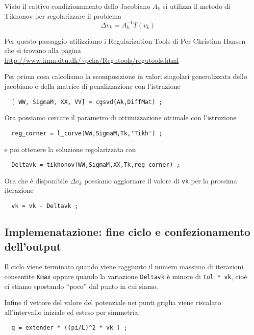 \documentclass[a4paper,10pt]{article}
\theoremstyle{plain}
\theoremstyle{definition}
\theoremstyle{remark}
\begin{document}
Visto il cattivo condizionamento dello Jacobiano $A_k$ si utilizza il
metodo di Tikhonov per regolarizzare il problema 
\begin{equation*}
  \Delta v _k = A_k ^{-1} T(v_k)
\end{equation*}

Per questo passaggio utilizziamo i Regularization Tools di Per
Christian Hansen che si trovano alla pagina
\url{http://www.imm.dtu.dk/~pcha/Regutools/regutools.html}

Per prima cosa calcoliamo la scomposizione in valori singolari
generalizzata dello jacobiano e della matrice di penalizzazione con
l'istruzione
\begin{lstlisting}
  [ WW, SigmaM, XX, VV] = cgsvd(Ak,DiffMat) ;
\end{lstlisting}

Ora possiamo cercare il parametro di ottimizzazione ottimale con
l'istruzione
\begin{lstlisting}
  reg_corner = l_curve(WW,SigmaM,Tk,'Tikh') ;
\end{lstlisting}
e poi ottenere la soluzione regolarizzata con
\begin{lstlisting}
  Deltavk = tikhonov(WW,SigmaM,XX,Tk,reg_corner) ;
\end{lstlisting}

Ora che è disponibile $\Delta v_k$ possiamo aggiornare il valore di
\lstinline{vk} per la prossima iterazione
\begin{lstlisting}
  vk = vk - Deltavk ;
\end{lstlisting}

\subsection{Implemenatazione: fine ciclo e confezionamento dell'output}

Il ciclo viene terminato quando viene raggiunto il numero massimo di
iterazioni consentite \lstinline{Kmax} oppure quando la variazione
\lstinline{Deltavk} è minore di \lstinline{tol * vk}, cioè ci stiamo
spostando ``poco'' dal punto in cui siamo.

Infine il vettore del valore del potenziale nei punti griglia viene
riscalato all'intervallo iniziale ed esteso per simmetria.
\begin{lstlisting}
  q = extender * ((pi/L)^2 * vk ) ;
\end{lstlisting}
\end{document}
